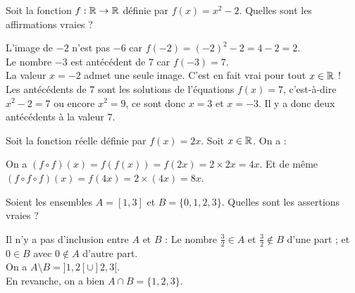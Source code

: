 \begin{question}
Soit la fonction $f : \mathbb{R} \to \mathbb{R}$ définie par $f(x) = x^2-2$.
Quelles sont les affirmations vraies ?
\begin{answers} 
\end{answers}
\begin{explanations} 
L'image de $-2$ n'est pas $-6$ car $f(-2) = (-2)^2-2=4-2=2$. \\
Le nombre $-3$ est antécédent de $7$ car $f(-3) = 7$. \\
La valeur $x=-2$ admet une seule image. C'est en fait vrai pour tout $x\in\mathbb{R}$ !\\
Les antécédents de $7$ sont les solutions de l'équations $f(x) = 7$, c'est-à-dire $x^2-2=7$ ou encore $x^2=9$, ce sont donc $x=3$ et $x=-3$. Il y a donc deux antécédents à la valeur $7$.
\end{explanations}
\end{question}


\begin{question}
Soit la fonction réelle définie par $f(x) = 2x$. Soit $x\in\mathbb{R}$. On a :
\begin{answers} 
\end{answers}
\begin{explanations} 
On a $(f\circ f) (x) = f(f(x)) = f(2x) = 2\times 2x = 4x$. Et de même $(f \circ f \circ f) (x) = f(4x) = 2\times (4x) = 8x$.
\end{explanations}
\end{question}


\begin{question}
Soient les ensembles $A = [1,3]$ et $B= \{ 0 , 1 , 2 , 3 \}$. Quelles sont les assertions vraies ?
\begin{answers} 
	\bad{$A \setminus B = ]1,3[$}
\end{answers}
\begin{explanations} 
Il n'y a pas d'inclusion entre $A$ et $B$ : Le nombre $\frac32 \in A $ et $\frac32 \notin B$ d'une part ; et $0 \in B$ avec $0 \notin A$ d'autre part.\\
On a $A \setminus B = ]1,2[ \cup ]2,3[$.\\
En revanche, on a bien $A \cap B = \{1,2,3\}$.
\end{explanations}
\end{question}



